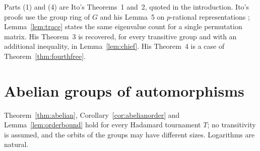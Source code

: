 \documentclass[11pt]{amsart}
\theoremstyle{definition}
\theoremstyle{remark}
\begin{document}
Parts (1) and (4) are Ito's Theorems~1 and~2, quoted in the introduction. Ito's proofs use the group ring of $G$ and his Lemma~5 on $p$-rational representations \cite[p.~39]{Ito84}; Lemma~\ref{lem:trace} states the same eigenvalue count for a single permutation matrix. His Theorem~3 is recovered, for every transitive group and with an additional inequality, in Lemma~\ref{lem:chief}. His Theorem~4 is a case of Theorem~\ref{thm:fourthfree}.

\section{Abelian groups of automorphisms}\label{sec:abelian}

Theorem~\ref{thm:abelian}, Corollary~\ref{cor:abelianorder} and Lemma~\ref{lem:orderbound} hold for every Hadamard tournament $T$; no transitivity is assumed, and the orbits of the groups may have different sizes. Logarithms are natural.
\end{document}
